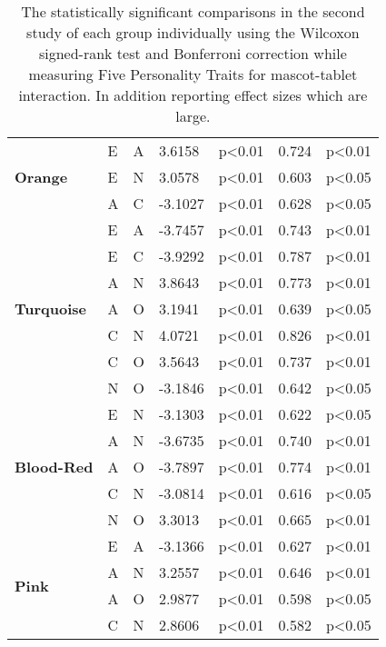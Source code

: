 \begin{table}
\begin{center}
\begin{tabular}{ |p{2cm}| p{0.5cm}|p{0.5cm}|p{1.3cm}| p{2.1cm}|p{1cm}|p{1.7cm}|  }
            \hline
            \hline
            \multirow{3}{*}{\textbf{Orange}}
            &E &A &3.6158 &p<0.01 & 0.724 &p<0.01\\
            &E &N &3.0578 &p<0.01 &0.603 &p<0.05\\
            &A &C &-3.1027 &p<0.01 & 0.628 &p<0.05\\
            \hline
            \hline
            \multirow{7}{*}{\textbf{Turquoise}}
            &E &A &-3.7457 &p<0.01 &0.743 &p<0.01\\
            &E &C &-3.9292 &p<0.01 &0.787 &p<0.01\\
            &A &N &3.8643 &p<0.01 &0.773 &p<0.01\\
            &A &O &3.1941 &p<0.01 &0.639 &p<0.05\\
            &C &N &4.0721 &p<0.01 &0.826 &p<0.01\\
            &C &O &3.5643 &p<0.01 & 0.737 &p<0.01\\
            &N &O &-3.1846 &p<0.01 & 0.642 &p<0.05\\
            \hline
            \hline
            \multirow{5}{*}{\textbf{Blood-Red}}
            &E &N &-3.1303 &p<0.01 &0.622 &p<0.05\\
            &A &N &-3.6735 &p<0.01 &0.740 &p<0.01\\
            &A &O &-3.7897 &p<0.01 &0.774 &p<0.01\\
            &C &N &-3.0814 &p<0.01 &0.616 &p<0.05\\
            &N &O &3.3013 &p<0.01 &0.665 &p<0.01\\
            \hline
            \hline
            \multirow{4}{*}{\textbf{Pink}}
            &E &A &-3.1366 &p<0.01 &0.627 &p<0.01\\
            &A &N &3.2557 &p<0.01 &0.646 &p<0.01\\
            &A &O &2.9877 &p<0.01 &0.598 &p<0.05\\
            &C &N &2.8606 &p<0.01 & 0.582 &p<0.05\\
            \hline
        \end{tabular}
    \end{center}
    \captionsetup{width=13.5cm}
    \caption{The statistically significant comparisons in the second study of each group individually using the Wilcoxon
    signed-rank test and Bonferroni correction while measuring Five Personality Traits for mascot-tablet interaction.
    In addition reporting effect sizes which are large.}
    \label{table:wilcoxMT2}
\end{table}
